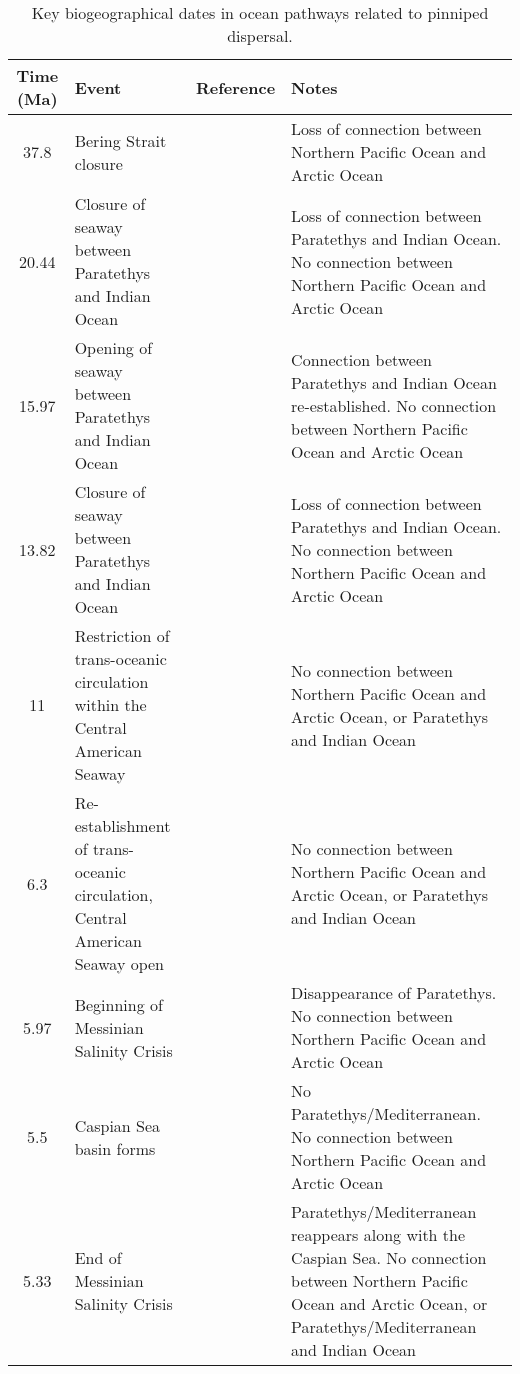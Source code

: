 \begin{longtable}{cp{}cp{}}

\caption{Key biogeographical dates in ocean pathways related to pinniped dispersal.}\\

\hline
\textbf{Time (Ma)} & \textbf{Event} & \textbf{Reference} & \textbf{Notes}\\
\hline
37.8 &
Bering Strait closure &
\cite{gladenkov2002refined} &
Loss of connection between Northern Pacific Ocean and Arctic Ocean \\
20.44 &
Closure of seaway between Paratethys and Indian Ocean &
\cite{rogl1999mediterranean} &
Loss of connection between Paratethys and Indian Ocean. No connection between Northern Pacific Ocean and Arctic Ocean \\  
15.97 &
Opening of seaway between Paratethys and Indian Ocean &
\cite{rogl1999mediterranean} &
Connection between Paratethys and Indian Ocean re-established. No connection between Northern Pacific Ocean and Arctic Ocean\\
13.82 &
Closure of seaway between Paratethys and Indian Ocean &
\cite{rogl1999mediterranean} &
Loss of connection between Paratethys and Indian Ocean. No connection between Northern Pacific Ocean and Arctic Ocean \\
11 &
Restriction of trans-oceanic circulation within the Central American Seaway &
\cite{duque1990neogene} &
No connection between Northern Pacific Ocean and Arctic Ocean, or Paratethys and Indian Ocean \\
6.3 &
Re-establishment of trans-oceanic circulation, Central American Seaway open &
\cite{duque1990neogene} &
No connection between Northern Pacific Ocean and Arctic Ocean, or Paratethys and Indian Ocean \\
5.97 &
Beginning of Messinian Salinity Crisis &
\cite{manzi2018onset, micallef2018evidence} &
Disappearance of Paratethys. No connection between Northern Pacific Ocean and Arctic Ocean \\
5.5 &
Caspian Sea basin forms &
\cite{kazmin2011} &
No Paratethys/Mediterranean. No connection between Northern Pacific Ocean and Arctic Ocean \\
5.33 &
End of Messinian Salinity Crisis &
\cite{manzi2018onset, micallef2018evidence} &
Paratethys/Mediterranean reappears along with the Caspian Sea. No connection between Northern Pacific Ocean and Arctic Ocean, or Paratethys/Mediterranean and Indian Ocean \\

\end{longtable}
